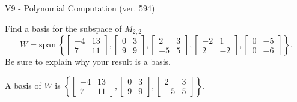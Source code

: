 \begin{exercise}
  \begin{exerciseTitle}V9 - Polynomial Computation (ver. 594)\end{exerciseTitle}
  \begin{exerciseStatement}
    Find a basis for the subspace of \(M_{2,2}\) 
\[W=\mathrm{span}\ \left\{\left[\begin{array}{cc}
-4 & 13 \\
7 & 11
\end{array}\right] , \left[\begin{array}{cc}
0 & 3 \\
9 & 9
\end{array}\right] , \left[\begin{array}{cc}
2 & 3 \\
-5 & 5
\end{array}\right] , \left[\begin{array}{cc}
-2 & 1 \\
2 & -2
\end{array}\right] , \left[\begin{array}{cc}
0 & -5 \\
0 & -6
\end{array}\right]\right\}.\]
 Be sure to explain why your result is a basis.


  \end{exerciseStatement}
  \begin{exerciseAnswer}
   A basis of \(W\) is  \(\left\{\left[\begin{array}{cc}
-4 & 13 \\
7 & 11
\end{array}\right] , \left[\begin{array}{cc}
0 & 3 \\
9 & 9
\end{array}\right] , \left[\begin{array}{cc}
2 & 3 \\
-5 & 5
\end{array}\right]\right\}\).
  


  \end{exerciseAnswer}
\end{exercise}
